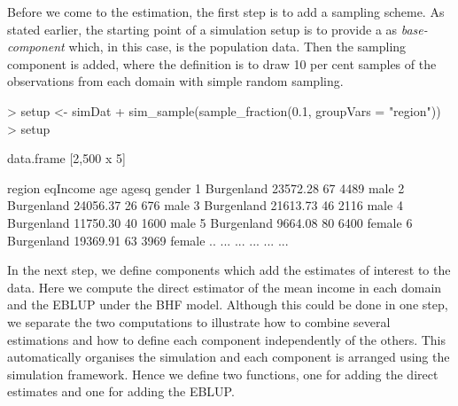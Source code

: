 \documentclass[article]{ajs}
\begin{document}
Before we come to the estimation, the first step is to add a sampling scheme. As stated earlier, the starting point of a simulation setup is to provide a  as \textit{base-component} which, in this case, is the population data. Then the sampling component is added, where the definition is to draw 10 per cent samples of the observations from each domain with simple random sampling.

\begin{Schunk}
\begin{Sinput}
> setup <- simDat %
+   sim_sample(sample_fraction(0.1, groupVars = "region"))
> setup
\end{Sinput}
\begin{Soutput}
data.frame [2,500 x 5]

       region eqIncome age agesq gender
1  Burgenland 23572.28  67  4489   male
2  Burgenland 24056.37  26   676   male
3  Burgenland 21613.73  46  2116   male
4  Burgenland 11750.30  40  1600   male
5  Burgenland  9664.08  80  6400 female
6  Burgenland 19369.91  63  3969 female
..        ...      ... ...   ...    ...
\end{Soutput}
\end{Schunk}

In the next step, we define components which add the estimates of interest to the data. Here we compute the direct estimator of the mean income in each domain and the EBLUP under the BHF model. Although this could be done in one step, we separate the two computations to illustrate how to combine several estimations and how to define each component independently of the others. This automatically organises the simulation and each component is arranged using the simulation framework. Hence we define two functions, one for adding the direct estimates and one for adding the EBLUP.

\begin{Schunk}
\end{Schunk}
\end{document}
